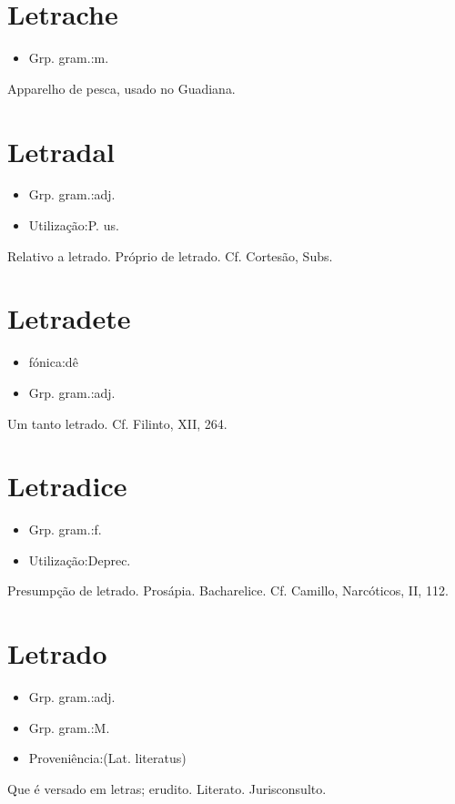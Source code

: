 \section{Letrache}
\begin{itemize}
\item {Grp. gram.:m.}
\end{itemize}
Apparelho de pesca, usado no Guadiana.
\section{Letradal}
\begin{itemize}
\item {Grp. gram.:adj.}
\end{itemize}
\begin{itemize}
\item {Utilização:P. us.}
\end{itemize}
Relativo a letrado.
Próprio de letrado. Cf. Cortesão, \textunderscore Subs.\textunderscore 
\section{Letradete}
\begin{itemize}
\item {fónica:dê}
\end{itemize}
\begin{itemize}
\item {Grp. gram.:adj.}
\end{itemize}
Um tanto letrado. Cf. Filinto, XII, 264.
\section{Letradice}
\begin{itemize}
\item {Grp. gram.:f.}
\end{itemize}
\begin{itemize}
\item {Utilização:Deprec.}
\end{itemize}
Presumpção de letrado.
Prosápia.
Bacharelice. Cf. Camillo, \textunderscore Narcóticos\textunderscore , II, 112.
\section{Letrado}
\begin{itemize}
\item {Grp. gram.:adj.}
\end{itemize}
\begin{itemize}
\item {Grp. gram.:M.}
\end{itemize}
\begin{itemize}
\item {Proveniência:(Lat. \textunderscore literatus\textunderscore )}
\end{itemize}
Que é versado em letras; erudito.
Literato.
Jurisconsulto.
